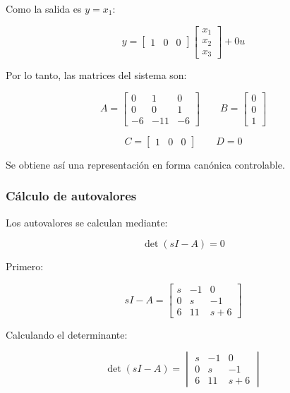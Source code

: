 \documentclass[12pt,a4paper]{article}
\begin{document}
Como la salida es $y=x_1$:

\begin{equation}y=\begin{bmatrix}1&0&0\end{bmatrix} \begin{bmatrix}x_1\\x_2\\x_3\end{bmatrix}+0u\end{equation}

Por lo tanto, las matrices del sistema son:

\begin{equation}\boxed{A=\begin{bmatrix}0&1&0\\0&0&1\\-6&-11&-6\end{bmatrix} \qquad B=\begin{bmatrix}0\\0\\1\end{bmatrix}}\end{equation}

\begin{equation}\boxed{C=\begin{bmatrix}1&0&0\end{bmatrix} \qquad D=0}\end{equation}

Se obtiene así una representación en forma canónica controlable.
\subsubsection*{Cálculo de autovalores}
Los autovalores se calculan mediante:

\begin{equation}\det(sI-A)=0\end{equation}

Primero:

\begin{equation}sI-A=\begin{bmatrix}s&-1&0\\0&s&-1\\6&11&s+6\end{bmatrix}\end{equation}

Calculando el determinante:

\begin{equation}\det(sI-A)=\begin{vmatrix}s&-1&0\\0&s&-1\\6&11&s+6\end{vmatrix}\end{equation}
\end{document}
